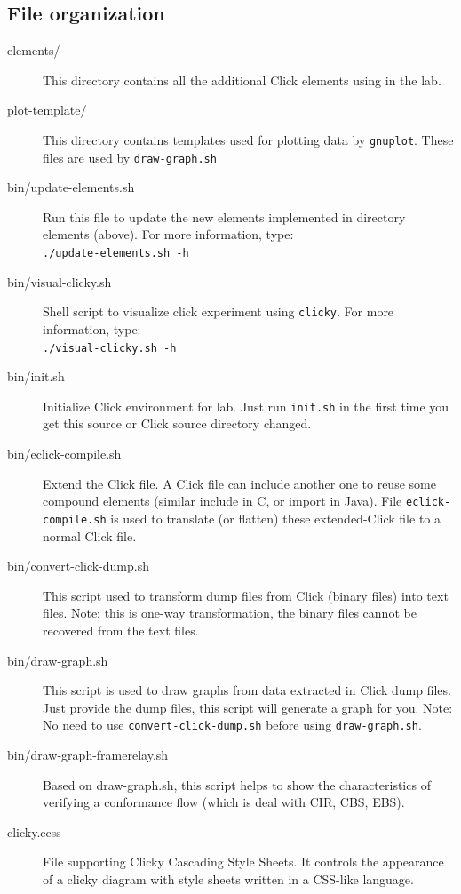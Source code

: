 \documentclass[a4paper]{article}
\begin{document}
    \subsection{File organization}
      \begin{description}
      	\item[elements/] This directory contains all the additional Click elements using in the lab.
      	\item[plot-template/] This directory contains templates used for plotting data by \texttt{gnuplot}. These files are used by \texttt{draw-graph.sh}
      	\item[bin/update-elements.sh] Run this file to update the new elements implemented in directory elements (above). For more information, type: \\
      	\texttt{./update-elements.sh -h}
      	\item[bin/visual-clicky.sh]Shell script to visualize click experiment using \texttt{clicky}. For more information, type: \\ 
      	\texttt{./visual-clicky.sh -h}
      	\item[bin/init.sh]Initialize Click environment for lab. Just run \texttt{init.sh} in the first time you get this source or Click source directory changed.
      	\item[bin/eclick-compile.sh] Extend the Click file. A Click file can include another one to reuse some compound elements (similar include in C, or import in Java). File \texttt{eclick-compile.sh} is used to translate (or flatten) these extended-Click file to a normal Click file.
      	\item[bin/convert-click-dump.sh]This script used to transform dump files from Click (binary files) into text files. Note: this is one-way transformation, the binary files cannot be recovered from the text files.
      	\item[bin/draw-graph.sh] This script is used to draw graphs from data extracted in Click dump files. Just provide the dump files, this script will generate a graph for you. Note: No need to use \texttt{convert-click-dump.sh} before using \texttt{draw-graph.sh}.
      	\item[bin/draw-graph-framerelay.sh] Based on draw-graph.sh, this script helps to show the characteristics of verifying a conformance flow (which is deal with CIR, CBS, EBS).
      	\item[clicky.ccss] File supporting Clicky Cascading Style Sheets. It controls the appearance of a clicky diagram with style sheets written in a CSS-like language.      	

\end{description}
\end{document}
